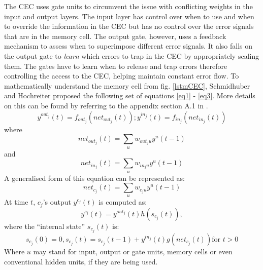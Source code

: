 \documentclass[12pt]{report}
\begin{document}
            The CEC uses gate units to circumvent the issue with conflicting weights in the input and output layers. The input layer has control over when to use and when to override the information in the CEC but has no control over the error signals that are in the memory cell. The output gate, however, uses a feedback mechanism to assess when to superimpose different error signals. It also falls on the output gate to \textit{learn} which errors to trap in the CEC by appropriately scaling them. The gates have to learn when to release and trap errors therefore controlling the access to the CEC, helping maintain constant error flow. To mathematically understand the memory cell from fig. \ref{lstmCEC}, Schmidhuber and Hochreiter proposed the following set of equations \ref{eq1} - \ref{eq3}. More details on this can be found by referring to the appendix section A.1 in \citep{lstmoriginal}.
            \begin{equation}\label{eq1}
                y^{{out }_{j}}(t)=f_{ {out }_{j}}\left( { net }_{ {out }_{j}}(t)\right) ; y^{i n_{j}}(t)=f_{i n_{j}}\left( { net }_{i n_{j}}(t)\right)
            \end{equation}
	        where
            \begin{equation}\label{eq2}
                net_{out_{j}}(t)=\sum_{u} w_{out_{j} u} y^{u}(t-1)
            \end{equation}
            and
            \begin{equation}\label{eq3}
                            net_{in_{j}}(t)=\sum_{u} w_{in_{j} u} y^{u}(t-1)
            \end{equation}
            A generalised form of this equation can be represented as:
            \begin{equation}\label{eq4}
                            net_{c_{j}}(t)=\sum_{u} w_{c_{j} u} y^{u}(t-1)
            \end{equation}
            At time $ t $, $ c_{j} $'s output $ y^{c_{j}}(t) $ is computed as:
            \begin{equation}\label{eq5}
                y^{c_{j}}(t) = y^{out_{j}}(t)h(s_{c_{j}}(t)),
            \end{equation}
            where the ``internal state'' $ s_{c_j}(t) $ is:
            \begin{equation}\label{eq6}
                s_{c_{j}}(0)=0, s_{c_{j}}(t)=s_{c_{j}}(t-1)+y^{i n_{j}}(t) g\left( { net }_{c_{j}}(t)\right) \textrm{for } t>0
            \end{equation}
            Where $ u $ may stand for input, output or gate units, memory cells or even conventional hidden units, if they are being used.
\end{document}
